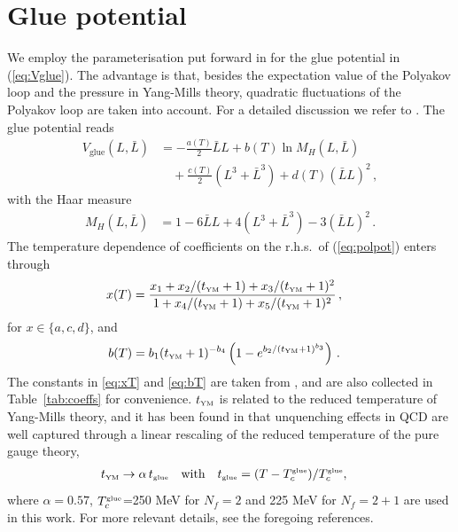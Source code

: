 \documentclass[%
reprint,
superscriptaddress,
showpacs,preprintnumbers,
 amsmath,amssymb,
 aps,
prd,
]{revtex4-1}
\def\eq#1{(\ref{#1})}
\def\Tab#1{Table~\ref{#1}}
\begin{document}

\section{Glue potential}
\label{app:gluepot}

We employ the parameterisation put forward in \cite{Lo:2013hla} for
the glue potential in \eq{eq:Vglue}. The advantage is that, besides
the expectation value of the Polyakov loop and the pressure in
Yang-Mills theory, quadratic fluctuations of the Polyakov loop are
taken into account. For a detailed discussion we refer to
\cite{Fu:2015naa}. The glue potential reads
%
\begin{align}
  V_\text{glue}(L,\bar{L})
  &= -\frac{a(T)}{2} \bar L L + b(T)
    \ln M_H(L,\bar{L})\nonumber \\[1ex]
  &\quad + \frac{c(T)}{2} (L^3+\bar L^3) + d(T) (\bar{L} L)^2\,,
                             \label{eq:polpot}
\end{align}
%
with the Haar measure 
%
\begin{align}
  M_H (L, \bar{L})
  &= 1 -6 \bar{L}L + 4 (L^3+\bar{L}^3) - 3  (\bar{L}L)^2\,.
\end{align}
%
The temperature dependence of coefficients on the r.h.s.\ of
\eq{eq:polpot} enters through
%
\begin{align}
  x(T)
  &= \frac{x_1 + x_2/(t_{\text{\tiny{YM}}}+1) + x_3/(t_{\text{\tiny{YM}}}+1)^2}{1 +
    x_4/(t_{\text{\tiny{YM}}}+1) + x_5/(t_{\text{\tiny{YM}}}+1)^2}\,,\label{eq:xT}
\end{align}
%
for $x\in \{a,c,d\}$, and 
%
\begin{align}
  b(T )
  &= b_1 (t_{\text{\tiny{YM}}}+1)^{-b_4}\left (1 -e^{b_2/(t_{\text{\tiny{YM}}}+1)^{b_3}} \right)\,.
          \label{eq:bT}
\end{align}
%
The constants in \ref{eq:xT} and \ref{eq:bT} are taken from
\cite{Lo:2013hla}, and are also collected in \Tab{tab:coeffs} for
convenience. $t_{\text{\tiny{YM}}}$ is related to the reduced
temperature of Yang-Mills theory, and it has been found in
\cite{Pawlowski:2010ht, Haas:2013qwp, Herbst:2013ufa} that unquenching
effects in QCD are well captured through a linear rescaling of the
reduced temperature of the pure gauge theory,
%
\begin{align}
  t_{\text{\tiny{YM}}}
  &\rightarrow \alpha\,t_{\text{\tiny{glue}}}
    \quad \text{with}\quad t_{\text{\tiny{glue}}}=
    (T-T_c^\text{\tiny{glue}})/T_c^\text{\tiny{glue}},\label{}
\end{align}
%
where $\alpha=0.57$, $T_c^\text{\tiny{glue}}$=250 MeV for $N_f=2$ and
225 MeV for $N_f=2+1$ are used in this work. For more relevant
details, see the foregoing references.
\end{document}
